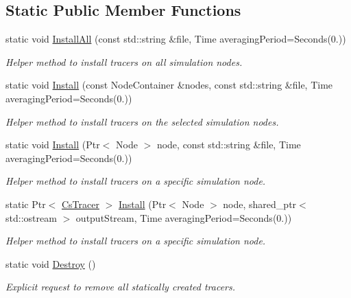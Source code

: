 \subsection*{Static Public Member Functions}
\begin{DoxyCompactItemize}
\item 
static void \hyperlink{classns3_1_1ndn_1_1CsTracer_a3e745ff5a244c0df5f144d044bc1e1ac}{Install\+All} (const std\+::string \&file, Time averaging\+Period=Seconds(0.))
\begin{DoxyCompactList}\small\item\em Helper method to install tracers on all simulation nodes. \end{DoxyCompactList}\item 
static void \hyperlink{classns3_1_1ndn_1_1CsTracer_a6f105baba9a85e74fe6124e473f57e26}{Install} (const Node\+Container \&nodes, const std\+::string \&file, Time averaging\+Period=Seconds(0.))
\begin{DoxyCompactList}\small\item\em Helper method to install tracers on the selected simulation nodes. \end{DoxyCompactList}\item 
static void \hyperlink{classns3_1_1ndn_1_1CsTracer_a81cf8a80b07326660c2fd8324a71d038}{Install} (Ptr$<$ Node $>$ node, const std\+::string \&file, Time averaging\+Period=Seconds(0.))
\begin{DoxyCompactList}\small\item\em Helper method to install tracers on a specific simulation node. \end{DoxyCompactList}\item 
static Ptr$<$ \hyperlink{classns3_1_1ndn_1_1CsTracer}{Cs\+Tracer} $>$ \hyperlink{classns3_1_1ndn_1_1CsTracer_a4577058f172fa1eac038e35572eae8de}{Install} (Ptr$<$ Node $>$ node, shared\+\_\+ptr$<$ std\+::ostream $>$ output\+Stream, Time averaging\+Period=Seconds(0.))
\begin{DoxyCompactList}\small\item\em Helper method to install tracers on a specific simulation node. \end{DoxyCompactList}\item 
static void \hyperlink{classns3_1_1ndn_1_1CsTracer_a28af59527634a6d2b8b1ee70591dd925}{Destroy} ()
\begin{DoxyCompactList}\small\item\em Explicit request to remove all statically created tracers. \end{DoxyCompactList}\end{DoxyCompactItemize}


